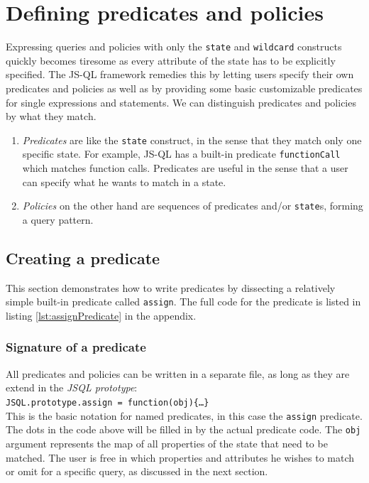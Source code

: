\section{Defining predicates and policies}
\label{sec:DefiningPolicies}


Expressing queries and policies with only the \texttt{state} and \texttt{wildcard} constructs quickly becomes tiresome as every attribute of the state has to be explicitly specified. The JS-QL framework remedies this by letting users specify their own predicates and policies as well as by providing some basic customizable predicates for single expressions and statements.
We can distinguish predicates and policies by what they match. 
\begin{enumerate}
\item \textit{Predicates} are like the \texttt{state} construct, in the sense that they match only one specific state. For example, JS-QL has a built-in predicate \texttt{functionCall} which matches function calls. Predicates are useful in the sense that a user can specify what he wants to match in a state.
\item \textit{Policies} on the other hand are sequences of predicates and/or \texttt{state}s, forming a query pattern. 
\end{enumerate}

\subsection{Creating a predicate}

This section demonstrates how to write predicates by dissecting a relatively simple built-in predicate called \texttt{assign}. The full code for the predicate is listed in listing \ref{lst:assignPredicate} in the appendix.

\subsubsection*{Signature of a predicate}
All predicates and policies can be written in a separate file, as long as they are extend in the \textit{JSQL prototype}:\\
\texttt{JSQL.prototype.assign = function(obj)\{\ldots \}}\\
This is the basic notation for named predicates, in this case the \texttt{assign} predicate. The dots in the code above will be filled in by the actual predicate code. The \texttt{obj} argument represents the map of all properties of the state that need to be matched. The user is free in which properties and attributes he wishes to match or omit for a specific query, as discussed in the next section.

